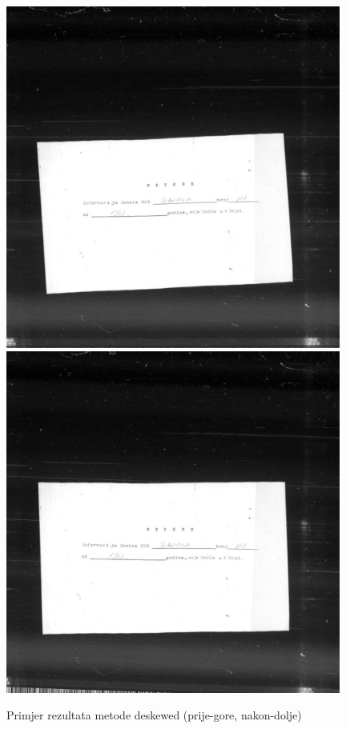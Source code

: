 \documentclass[times, utf8, zavrsni, numeric]{fer}
\begin{document}
\begin{figure}[H]
\centering
    \includegraphics[width=11cm]{images/Z05353721.jpg}
    \includegraphics[width=11cm]{images/Z05353721_deskewed.jpg}
    \caption{Primjer rezultata metode deskewed (prije-gore, nakon-dolje)}
	\label{fig:example_deskewed}
\end{figure}
\pagebreak
\end{document}
